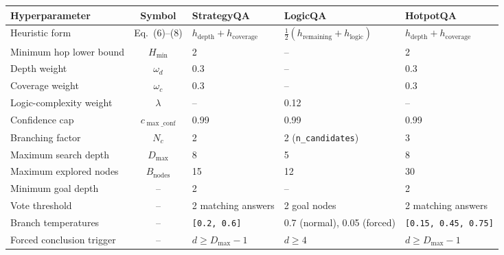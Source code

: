 \documentclass[11pt]{article}
\begin{document}

\begin{table}
\centering
\scriptsize
\setlength{\tabcolsep}{4pt}
\renewcommand{\arraystretch}{1.15}
\begin{tabular}{p{3.6cm} c p{4.2cm} p{4.2cm} p{4.6cm}}
\toprule
\textbf{Hyperparameter} & \textbf{Symbol} & \textbf{StrategyQA} & \textbf{LogicQA} & \textbf{HotpotQA} \\
\midrule

Heuristic form 
& Eq.~(6)--(8) 
& $h_{\text{depth}} + h_{\text{coverage}}$
& $\frac{1}{2}(h_{\text{remaining}} + h_{\text{logic}})$
& $h_{\text{depth}} + h_{\text{coverage}}$ \\

Minimum hop lower bound 
& $H_{\min}$ 
& 2 
& -- 
& 2 \\

Depth weight 
& $\omega_d$ 
& 0.3 
& -- 
& 0.3 \\

Coverage weight 
& $\omega_c$ 
& 0.3 
& -- 
& 0.3 \\

Logic-complexity weight 
& $\lambda$ 
& -- 
& 0.12 
& -- \\

Confidence cap 
& $c_{\max\_\mathrm{conf}}$ 
& 0.99 
& 0.99 
& 0.99 \\

Branching factor 
& $N_c$ 
& 2 
& 2 (\texttt{n\_candidates}) 
& 3 \\

Maximum search depth 
& $D_{\max}$ 
& 8 
& 5 
& 8 \\

Maximum explored nodes 
& $B_{\text{nodes}}$ 
& 15 
& 12 
& 30 \\

Minimum goal depth 
& -- 
& 2 
& -- 
& 2 \\

Vote threshold 
& -- 
& 2 matching answers 
& 2 goal nodes 
& 2 matching answers \\

Branch temperatures 
& -- 
& \texttt{[0.2, 0.6]} 
& 0.7 (normal), 0.05 (forced) 
& \texttt{[0.15, 0.45, 0.75]} \\

Forced conclusion trigger 
& -- 
& $d \ge D_{\max}-1$ 
& $d \ge 4$ 
& $d \ge D_{\max}-1$ \\


\end{tabular}
\end{table}
\end{document}
